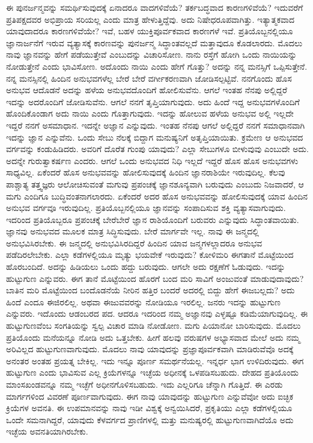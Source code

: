 ಈ ಪುನರ್ಜನ್ಮವನ್ನು ಸಮರ್ಥಿಸುವುದಕ್ಕೆ ಏನಾದರೂ ವಾದಗಳಿವೆಯೆ? ತರ್ಕಬದ್ಧವಾದ ಕಾರಣಗಳಿವೆಯೆ? ಇದುವರೆಗೆ ಪ್ರತಿಪಕ್ಷದವರ ಅಭಿಪ್ರಾಯ ಸರಿಯಲ್ಲ ಎಂದು ಮಾತ್ರ ಹೇಳುತ್ತಿದ್ದೆವು. ಅದು ನಿಷೇಧರೂಪವಾಗಿತ್ತು. ಇತ್ಯಾತ್ಮಕವಾದ ಯಾವುದಾದರೂ ಕಾರಣಗಳಿವೆಯೇ? ಇವೆ, ಬಹಳ ಯುಕ್ತಿಪೂರ್ವಕವಾದ ಕಾರಣಗಳೆ ಇವೆ. ಪ್ರತಿಯೊಬ್ಬನಲ್ಲಿಯೂ ಜ್ಞಾನಾರ್ಜನೆಗೆ ಇರುವ ವ್ಯತ್ಯಾಸಕ್ಕೆ ಕಾರಣವನ್ನು ಪುನರ್ಜನ್ಮ ಸಿದ್ಧಾಂತವಲ್ಲದೆ ಮತ್ತಾವುದೂ ಕೊಡಲಾರದು. ಮೊದಲು ನಾವು ಜ್ಞಾನವನ್ನು ಹೇಗೆ ಪಡೆಯುತ್ತೇವೆ ಎಂಬುದನ್ನು ವಿಚಾರಿಸೋಣ. ನಾನು ರಸ್ತೆಗೆ ಹೋಗಿ ಒಂದು ನಾಯಿಯನ್ನು ನೋಡುತ್ತೇನೆ ಎಂದು ಭಾವಿಸೋಣ. ಅದೊಂದು ನಾಯಿ ಎಂದು ಹೇಗೆ ಗೊತ್ತು? ಅದನ್ನು ನನ್ನ ಮನಸ್ಸಿಗೆ ಒಪ್ಪಿಸುತ್ತೇನೆ. ನನ್ನ ಮನಸ್ಸಿನಲ್ಲಿ ಹಿಂದಿನ ಅನುಭವಗಳೆಲ್ಲ ಬೇರೆ ಬೇರೆ ವರ್ಗೀಕರಣವಾಗಿ ಜೋಡಿಸಲ್ಪಟ್ಟಿವೆ. ನನಗೊಂದು ಹೊಸ ಅನುಭವ ಆದೊಡನೆ ಅದನ್ನು ಹಳೆಯ ಅನುಭವದೊಂದಿಗೆ ಹೋಲಿಸುವೆನು. ಆಗಲೆ ಇಂತಹ ನೆನಪು ಅಲ್ಲಿದ್ದರೆ ಇದನ್ನು ಅದರೊಂದಿಗೆ ಜೋಡಿಸುವೆನು. ಆಗಲೆ ನನಗೆ ತೃಪ್ತಿಯಾಗುವುದು. ಅದು ಹಿಂದೆ ಇದ್ದ ಅನುಭವಗಳೊಂದಿಗೆ ಹೊಂದಿಕೊಂಡಾಗ ಅದು ನಾಯಿ ಎಂದು ಗೊತ್ತಾಗುವುದು. ಇದನ್ನು ಹೋಲುವ ಹಳೆಯ ಅನುಭವ ಅಲ್ಲಿ ಇಲ್ಲದೇ ಇದ್ದರೆ ನನಗೆ ಅಸಮಾಧಾನ. ಇದನ್ನೇ ಅಜ್ಞಾನ ಎನ್ನುವುದು. ಇಂತಹ ನೆನಪು ಆಗಲೆ ಅಲ್ಲಿದ್ದರೆ ನನಗೆ ಸಮಾಧಾನವಾಗಿ ಇದನ್ನು ಜ್ಞಾನ ಎನ್ನುವೆನು. ಒಂದು ಸೇಬು ನೆಲಕ್ಕೆ ಬಿದ್ದಾಗ ಮನುಷ್ಯನಿಗೆ ಅತೃಪ್ತಿಯಾಯಿತು. ಕ್ರಮೇಣ ಆ ಅನುಭವದ ವರ್ಗವನ್ನು ಕಂಡುಹಿಡಿದರು. ಅವರಿಗೆ ದೊರೆತ ಗುಂಪು ಯಾವುದು? ಎಲ್ಲಾ ಸೇಬುಗಳೂ ಬೀಳುವುವು ಎಂಬುದೇ ಅದು. ಅದನ್ನೇ ಗುರುತ್ವಾಕರ್ಷಣ ಎಂದರು. ಆಗಲೆ ಒಂದು ಅನುಭವದ ನಿಧಿ ಇಲ್ಲದೆ ಇದ್ದರೆ ಹೊಸ ಹೊಸ ಅನುಭವಗಳು ಸಾಧ್ಯವಿಲ್ಲ. ಏಕೆಂದರೆ ಹೊಸ ಅನುಭವವನ್ನು ಹೋಲಿಸುವುದಕ್ಕೆ ಹಿಂದಿನ ಜ್ಞಾನರಾಶಿಯೇ ಇರುವುದಿಲ್ಲ. ಕೆಲವು ಪಾಶ್ಚಾತ್ಯ ತತ್ತ್ವಜ್ಞರು ಆಲೋಚಿಸುವಂತೆ ಮಗುವು ಪ್ರಪಂಚಕ್ಕೆ ಜ್ಞಾನಶೂನ್ಯವಾಗಿ ಬರುವುದು ಎಂಬುದು ನಿಜವಾದರೆ, ಆ ಮಗು ಎಂದಿಗೂ ಬುದ್ಧಿವಂತನಾಗಲಾರದು. ಏಕೆಂದರೆ ಅದರ ಹೊಸ ಅನುಭವವನ್ನು ಹೋಲಿಸುವುದಕ್ಕೆ ಯಾವ ಹಿಂದಿನ ಅನುಭವ ವರ್ಗವೂ ಇರುವುದಿಲ್ಲ. ಪ್ರತಿಯೊಬ್ಬನಲ್ಲಿಯೂ ಜ್ಞಾನವನ್ನು ಸಂಪಾದಿಸುವ ಶಕ್ತಿ ವ್ಯತ್ಯಾಸವಾಗುವುದು. ಇದರಿಂದ ಪ್ರತಿಯೊಬ್ಬರೂ ಪ್ರಪಂಚಕ್ಕೆ ಬೇರೆಬೇರೆ ಜ್ಞಾನ ರಾಶಿಯೊಂದಿಗೆ ಬರುವರು ಎನ್ನುವುದು ಸಿದ್ಧಾಂತವಾಯಿತು. ಜ್ಞಾನವು ಅನುಭವದ ಮೂಲಕ ಮಾತ್ರ ಸಿದ್ಧಿಸುವುದು. ಬೇರೆ ಮಾರ್ಗವೇ ಇಲ್ಲ. ನಾವು ಈ ಜನ್ಮದಲ್ಲಿ ಅನುಭವಿಸಿರಬೇಕು. ಈ ಜನ್ಮದಲ್ಲಿ ಅನುಭವಿಸಿರದಿದ್ದರೆ ಹಿಂದಿನ ಯಾವ ಜನ್ಮಗಳಲ್ಲಾದರೂ ಅನುಭವ ಪಡೆದಿರಲೇಬೇಕು. ಎಲ್ಲಾ ಕಡೆಗಳಲ್ಲಿಯೂ ಮೃತ್ಯು ಭಯವೇಕೆ ಇರುವುದು? ಕೋಳಿಮರಿ ಈಗತಾನೆ ಮೊಟ್ಟೆಯಿಂದ ಹೊರಬಂದಿದೆ. ಅದನ್ನು ಹಿಡಿಯಲು ಒಂದು ಹದ್ದು ಬರುವುದು. ಆಗಲೇ ಅದು ರಕ್ಷಣೆಗೆ ಓಡುವುದು. ಇದನ್ನು ಹುಟ್ಟುಗುಣ ಎನ್ನುವರು. ಈಗ ತಾನೆ ಮೊಟ್ಟೆಯಿಂದ ಹೊರಗೆ ಬಂದ ಮರಿ ಸಾವಿಗೆ ಅಂಜುವಂತೆ ಮಾಡುವುದಾವುದು? ಬಾತಿನ ಮರಿ ಮೊಟ್ಟೆಯಿಂದ ಬಂದೊಡನೆಯೆ ನೀರಿನ ಹತ್ತಿರ ಬಂದರೆ ಅದರಲ್ಲಿ ಬಿದ್ದು ಹೇಗೆ ಈಜಬಲ್ಲದು? ಅದು ಹಿಂದೆ ಎಂದೂ ಈಜಿರಲಿಲ್ಲ. ಅಥವಾ ಈಜುವವರನ್ನು ನೋಡಿಯೂ ಇರಲಿಲ್ಲ. ಜನರು ಇದನ್ನು ಹುಟ್ಟುಗುಣ ಎನ್ನುವರು. ಇದೊಂದು ಆಡಂಬರದ ಪದ. ಆದರೂ ಇದರಿಂದ ನಮ್ಮ ಅಜ್ಞಾನವು ಎಳ್ಳಷ್ಟೂ ಕಡಿಮೆಯಾಗುವುದಿಲ್ಲ. ಈ ಹುಟ್ಟುಗುಣವೆಂಬ ಸಂಗತಿಯನ್ನು ಸ್ವಲ್ಪ ವಿಚಾರ ಮಾಡಿ ನೋಡೋಣ. ಮಗು ಪಿಯಾನೋ ಬಾರಿಸುವುದು. ಮೊದಲು ಪ್ರತಿಯೊಂದು ಮನೆಯನ್ನೂ ನೋಡಿ ಅದು ಒತ್ತಬೇಕು. ಹೀಗೆ ಹಲವು ವರುಷಗಳ ಅಭ್ಯಾಸವಾದ ಮೇಲೆ ಅದು ನಮ್ಮ ಅರಿವಿಲ್ಲದ ಹುಟ್ಟುಗುಣವಾಗುವುದು. ಮೊದಲು ನಾವು ಯಾವುದನ್ನು ಪ್ರಜ್ಞಾಪೂರ್ವಕವಾಗಿ ಮಾಡಿರುವೆವೊ ಅದಕ್ಕೆ ಅನಂತರ ಅಂತಹ ಪ್ರಯತ್ನ ಬೇಕಿಲ್ಲ. ಇದು ಇನ್ನೂ ಪೂರ್ಣ ಸಮರ್ಥನೆಯಲ್ಲ. ಇನ್ನರ್ಧ ಭಾಗ ಉಳಿದಿರುವುದು. ಈಗ ಹುಟ್ಟುಗುಣ ಎಂದು ಭಾವಿಸುವ ಎಲ್ಲ ಕ್ರಿಯೆಗಳನ್ನೂ ಇಚ್ಛೆಯ ಅಧೀನಕ್ಕೆ ಒಳಪಡಿಸಬಹುದು. ದೇಹದ ಪ್ರತಿಯೊಂದು ಮಾಂಸಖಂಡವನ್ನೂ ನಮ್ಮ ಇಚ್ಛೆಗೆ ಅಧೀನಗೊಳಿಸಬಹುದು. ಇದು ಎಲ್ಲರಿಗೂ ಚೆನ್ನಾಗಿ ಗೊತ್ತಿದೆ. ಈ ಎರಡು ಮಾರ್ಗಗಳಿಂದ ವಿವರಣೆ ಪೂರ್ಣವಾಗುವುದು. ಈಗ ನಾವು ಯಾವುದನ್ನು ಹುಟ್ಟುಗುಣ ಎನ್ನುವೆವೋ ಅದು ಐಚ್ಛಿಕ ಕ್ರಿಯೆಗಳ ಅವನತಿ. ಈ ಉಪಮಾನವನ್ನು ನಾವು ಇಡೀ ವಿಶ್ವಕ್ಕೆ ಅನ್ವಯಿಸಿದರೆ, ಪ್ರಕೃತಿಯು ಎಲ್ಲಾ ಕಡೆಗಳಲ್ಲಿಯೂ ಒಂದೇ ಸಮನಾಗಿದ್ದರೆ, ಯಾವುದು ಕೆಳವರ್ಗದ ಪ್ರಾಣಿಗಳಲ್ಲಿ ಮತ್ತು ಮನುಷ್ಯರಲ್ಲಿ ಹುಟ್ಟುಗುಣವಾಗಿದೆಯೊ ಅದು ಇಚ್ಛೆಯ ಅವನತಿಯಾಗಿರಬೇಕು.

